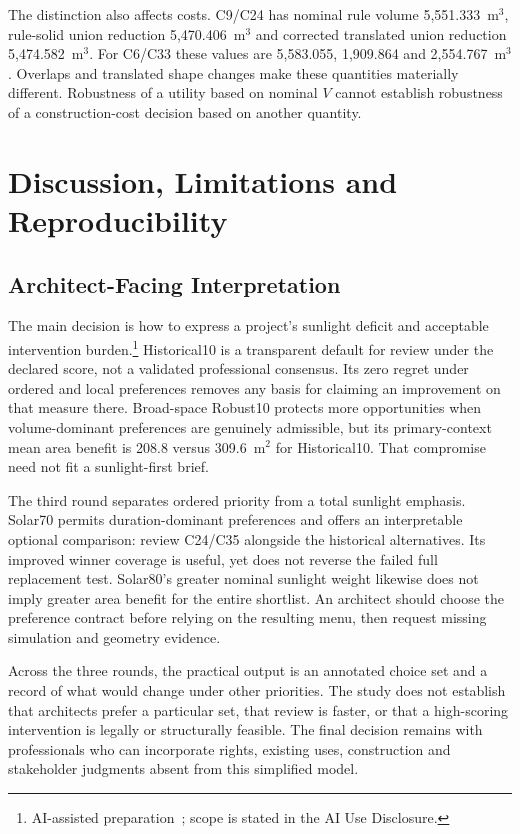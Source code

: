 \documentclass{llncs}
\newcommand{\aidraft}{\footnote{AI-assisted preparation~\cite{openai2026}; scope is stated in the AI Use Disclosure.}}
\begin{document}
The distinction also affects costs. C9/C24 has nominal rule volume 5,551.333~m$^3$, rule-solid union reduction 5,470.406~m$^3$ and corrected translated union reduction 5,474.582~m$^3$. For C6/C33 these values are 5,583.055, 1,909.864 and 2,554.767~m$^3$. Overlaps and translated shape changes make these quantities materially different. Robustness of a utility based on nominal $V$ cannot establish robustness of a construction-cost decision based on another quantity.

\section{Discussion, Limitations and Reproducibility}
\subsection{Architect-Facing Interpretation}
The main decision is how to express a project's sunlight deficit and acceptable intervention burden.\aidraft{} Historical10 is a transparent default for review under the declared score, not a validated professional consensus. Its zero regret under ordered and local preferences removes any basis for claiming an improvement on that measure there. Broad-space Robust10 protects more opportunities when volume-dominant preferences are genuinely admissible, but its primary-context mean area benefit is 208.8 versus 309.6~m$^2$ for Historical10. That compromise need not fit a sunlight-first brief.

The third round separates ordered priority from a total sunlight emphasis. Solar70 permits duration-dominant preferences and offers an interpretable optional comparison: review C24/C35 alongside the historical alternatives. Its improved winner coverage is useful, yet does not reverse the failed full replacement test. Solar80's greater nominal sunlight weight likewise does not imply greater area benefit for the entire shortlist. An architect should choose the preference contract before relying on the resulting menu, then request missing simulation and geometry evidence.

Across the three rounds, the practical output is an annotated choice set and a record of what would change under other priorities. The study does not establish that architects prefer a particular set, that review is faster, or that a high-scoring intervention is legally or structurally feasible. The final decision remains with professionals who can incorporate rights, existing uses, construction and stakeholder judgments absent from this simplified model.
\end{document}
